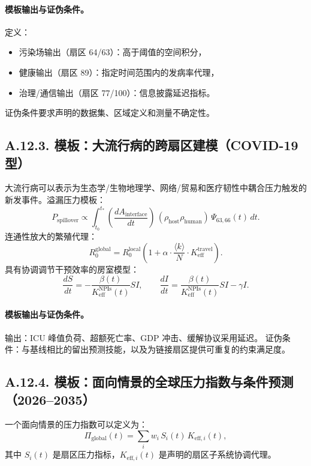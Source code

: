 \documentclass[11pt,a4paper]{article}
\begin{document}
	\paragraph{模板输出与证伪条件。}
	定义：
	\begin{itemize}[leftmargin=*]
		\item 污染场输出（扇区 64/63）：高于阈值的空间积分，
		\item 健康输出（扇区 89）：指定时间范围内的发病率代理，
		\item 治理/通信输出（扇区 77/100）：信息披露延迟指标。
	\end{itemize}
	证伪条件要求声明的数据集、区域定义和测量不确定性。
	
	\subsection*{A.12.3. 模板：大流行病的跨扇区建模（COVID-19 型）}
	
	大流行病可以表示为生态学/生物地理学、网络/贸易和医疗韧性中耦合压力触发的新发事件。溢漏压力模板：
	$$
	P_{\mathrm{spillover}} \propto \int_{t_0}^{t_{*}}
	\left(\frac{dA_{\mathrm{interface}}}{dt}\right)\,
	\left(\rho_{\mathrm{host}}\rho_{\mathrm{human}}\right)\,
	\Psi_{63,66}(t)\,dt.
	$$
	连通性放大的繁殖代理：
	$$
	R_0^{\mathrm{global}} = R_0^{\mathrm{local}}\left(1+\alpha\cdot \frac{\langle k\rangle}{N}\cdot K_{\mathrm{eff}}^{\mathrm{travel}}\right).
	$$
	具有协调调节干预效率的房室模型：
	$$
	\frac{dS}{dt} = - \frac{\beta(t)}{K_{\mathrm{eff}}^{\mathrm{NPIs}}(t)}SI,\qquad
	\frac{dI}{dt} = \frac{\beta(t)}{K_{\mathrm{eff}}^{\mathrm{NPIs}}(t)}SI - \gamma I.
	$$
	
	\paragraph{模板输出与证伪条件。}
	输出：ICU 峰值负荷、超额死亡率、GDP 冲击、缓解协议采用延迟。
	证伪条件：与基线相比的留出预测技能，以及为链接扇区提供可重复的约束满足度。
	
	\subsection*{A.12.4. 模板：面向情景的全球压力指数与条件预测（2026--2035）}
	
	一个面向情景的压力指数可以定义为：
	$$
	\Pi_{\mathrm{global}}(t) = \sum_i w_i\,S_i(t)\,K_{\mathrm{eff},i}(t),
	$$
	其中 $S_i(t)$ 是扇区压力指标，$K_{\mathrm{eff},i}(t)$ 是声明的扇区子系统协调代理。
	
\end{document}
